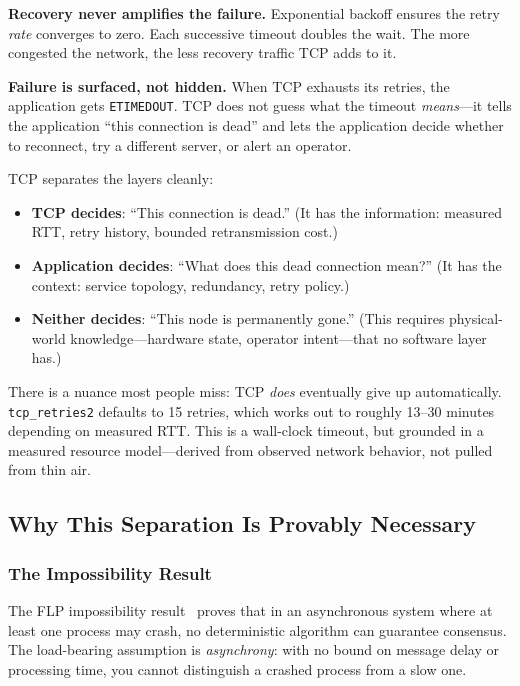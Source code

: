 \documentclass[11pt]{article}
\begin{document}
\textbf{Recovery never amplifies the failure.} Exponential backoff ensures the
retry \emph{rate} converges to zero. Each successive timeout doubles the wait.
The more congested the network, the less recovery traffic TCP adds to it.

\textbf{Failure is surfaced, not hidden.} When TCP exhausts its retries, the
application gets \texttt{ETIMEDOUT}. TCP does not guess what the timeout
\emph{means}---it tells the application ``this connection is dead'' and lets the
application decide whether to reconnect, try a different server, or alert an
operator.

TCP separates the layers cleanly:

\begin{itemize}
  \item \textbf{TCP decides}: ``This connection is dead.'' (It has the
    information: measured RTT, retry history, bounded retransmission cost.)
  \item \textbf{Application decides}: ``What does this dead connection mean?''
    (It has the context: service topology, redundancy, retry policy.)
  \item \textbf{Neither decides}: ``This node is permanently gone.'' (This
    requires physical-world knowledge---hardware state, operator intent---that
    no software layer has.)
\end{itemize}

There is a nuance most people miss: TCP \emph{does} eventually give up
automatically. \texttt{tcp\_retries2} defaults to 15 retries, which works out to
roughly 13--30 minutes depending on measured RTT. This is a wall-clock timeout,
but grounded in a measured resource model---derived from observed network
behavior, not pulled from thin air.

\subsection{Why This Separation Is Provably Necessary}
\label{sec:flp}

\subsubsection{The Impossibility Result}

The FLP impossibility result~\cite{fischer1985impossibility} proves that in an
asynchronous system where at least one process may crash, no deterministic
algorithm can guarantee consensus. The load-bearing assumption is
\emph{asynchrony}: with no bound on message delay or processing time, you cannot
distinguish a crashed process from a slow one.
\end{document}
